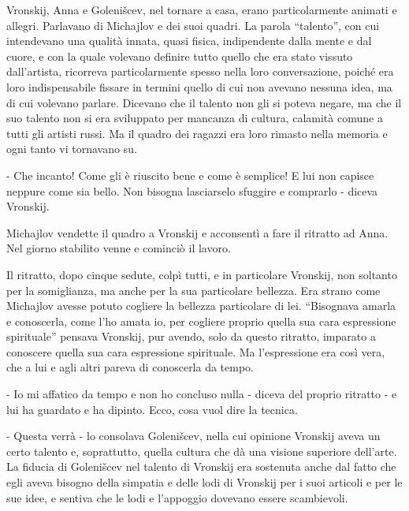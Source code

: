 Vronskij, Anna e Golenišcev, nel tornare a casa, erano particolarmente animati e allegri. Parlavano di Michajlov e dei suoi quadri. La parola ``talento'', con cui intendevano una qualità innata, quasi fisica, indipendente dalla mente e dal cuore, e con la quale volevano definire tutto quello che era stato vissuto dall'artista, ricorreva particolarmente spesso nella loro conversazione, poiché era loro indispensabile fissare in termini quello di cui non avevano nessuna idea, ma di cui volevano parlare. Dicevano che il talento non gli si poteva negare, ma che il suo talento non si era sviluppato per mancanza di cultura, calamità comune a tutti gli artisti russi. Ma il quadro dei ragazzi era loro rimasto nella memoria e ogni tanto vi tornavano su. 

- Che incanto! Come gli è riuscito bene e come è semplice! E lui non capisce neppure come sia bello. Non bisogna lasciarselo sfuggire e comprarlo - diceva Vronskij. 

Michajlov vendette il quadro a Vronskij e acconsentì a fare il ritratto ad Anna. Nel giorno stabilito venne e cominciò il lavoro. 

Il ritratto, dopo cinque sedute, colpì tutti, e in particolare Vronskij, non soltanto per la somiglianza, ma anche per la sua particolare bellezza. Era strano come Michajlov avesse potuto cogliere la bellezza particolare di lei. ``Bisognava amarla e conoscerla, come l'ho amata io, per cogliere proprio quella sua cara espressione spirituale'' pensava Vronskij, pur avendo, solo da questo ritratto, imparato a conoscere quella sua cara espressione spirituale. Ma l'espressione era così vera, che a lui e agli altri pareva di conoscerla da tempo. 

- Io mi affatico da tempo e non ho concluso nulla - diceva del proprio ritratto - e lui ha guardato e ha dipinto. Ecco, cosa vuol dire la tecnica. 

- Questa verrà - lo consolava Golenišcev, nella cui opinione Vronskij aveva un certo talento e, soprattutto, quella cultura che dà una visione superiore dell'arte. La fiducia di Golenišcev nel talento di Vronskij era sostenuta anche dal fatto che egli aveva bisogno della simpatia e delle lodi di Vronskij per i suoi articoli e per le sue idee, e sentiva che le lodi e l'appoggio dovevano essere scambievoli. 

